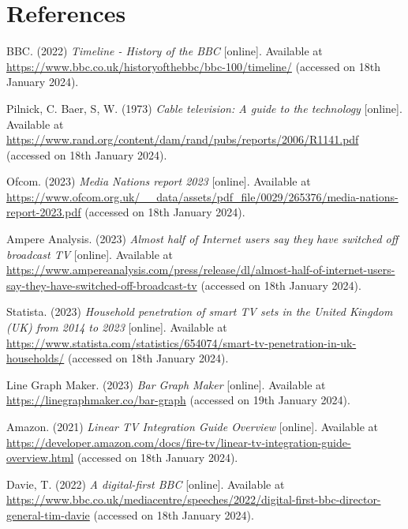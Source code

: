 \section{References}

\noindent BBC. (2022) \textit{Timeline - History of the BBC} [online]. Available at \url{https://www.bbc.co.uk/historyofthebbc/bbc-100/timeline/} (accessed on 18th January 2024).
\vspace{0.2cm}

\noindent Pilnick, C. Baer, S, W. (1973) \textit{Cable television: A guide to the technology} [online]. Available at \url{https://www.rand.org/content/dam/rand/pubs/reports/2006/R1141.pdf} (accessed on 18th January 2024).
\vspace{0.2cm}

\noindent Ofcom. (2023) \textit{Media Nations report 2023} [online]. Available at \url{https://www.ofcom.org.uk/__data/assets/pdf_file/0029/265376/media-nations-report-2023.pdf} (accessed on 18th January 2024).
\vspace{0.2cm}

\noindent Ampere Analysis. (2023) \textit{Almost half of Internet users say they have switched off broadcast TV} [online]. Available at \url{https://www.ampereanalysis.com/press/release/dl/almost-half-of-internet-users-say-they-have-switched-off-broadcast-tv} (accessed on 18th January 2024).
\vspace{0.2cm}

\noindent Statista. (2023) \textit{Household penetration of smart TV sets in the United Kingdom (UK) from 2014 to 2023} [online]. Available at \url{https://www.statista.com/statistics/654074/smart-tv-penetration-in-uk-households/} (accessed on 18th January 2024).
\vspace{0.2cm}

\noindent Line Graph Maker. (2023) \textit{Bar Graph Maker} [online]. Available at \url{https://linegraphmaker.co/bar-graph} (accessed on 19th January 2024).
\vspace{0.2cm}

\noindent Amazon. (2021) \textit{Linear TV Integration Guide Overview} [online]. Available at \url{https://developer.amazon.com/docs/fire-tv/linear-tv-integration-guide-overview.html} (accessed on 18th January 2024).
\vspace{0.2cm}

\noindent Davie, T. (2022) \textit{A digital-first BBC} [online]. Available at \url{https://www.bbc.co.uk/mediacentre/speeches/2022/digital-first-bbc-director-general-tim-davie} (accessed on 18th January 2024).
\vspace{0.2cm}

